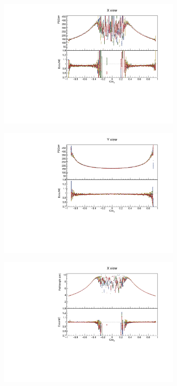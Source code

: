 \begin{figure}[!ht]
\begin{subfigure}{0.495\textwidth}
  \end{subfigure}
  \begin{subfigure}{0.495\textwidth}
    \includegraphics[width=\linewidth]{PlotsAngularDistribution/pecorr_cosx_x.pdf}
  \end{subfigure}
  \begin{subfigure}{0.495\textwidth}
    \includegraphics[width=\linewidth]{PlotsAngularDistribution/pecorr_cosx_y.pdf}
  \end{subfigure}
  \begin{subfigure}{0.495\textwidth}
    \includegraphics[width=\linewidth]{PlotsAngularDistribution/cm_cosx_x.pdf}

\end{subfigure}
\end{figure}
